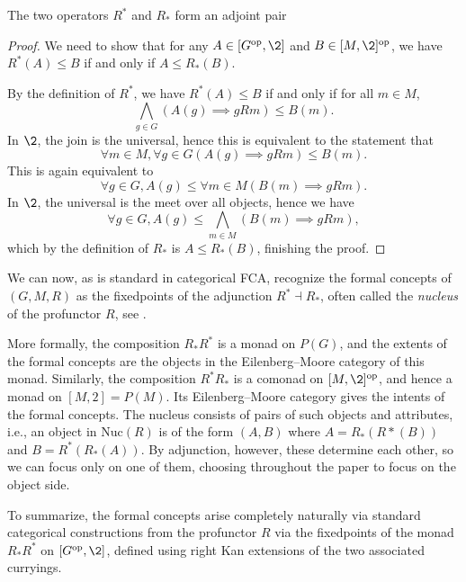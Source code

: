 \begin{lemma}
    \label{lm:adjoint-Delta}
    The two operators $R^*$ and $R_*$ form an adjoint pair
    \begin{center}
    \end{center}
\end{lemma}
\begin{proof}
    We need to show that for any $A\in [G\op, \2]$ and $B\in [M, \2]\op$, we have $R^*(A)\leq B$ if and only if $A\leq R_*(B)$. 

    By the definition of $R^*$, we have $R^*(A)\leq B$ if and only if for all $m\in M$, 
    \[\bigwedge_{g\in G}(A(g)\implies gRm)\leq B(m).\]
    In $\2$, the join is the universal, hence this is equivalent to the statement that 
    \[\forall m\in M, \forall g\in G (A(g)\implies gRm) \leq B(m).\]
    This is again equivalent to 
    \[\forall g\in G, A(g) \leq \forall m\in M (B(m) \implies gRm).\]
    In $\2$, the universal is the meet over all objects, hence we have 
    \[\forall g\in G, A(g) \leq \bigwedge_{m\in M} (B(m) \implies gRm),\]
    which by the definition of $R_*$ is $A\leq R_*(B)$, finishing the proof. 
\end{proof}

We can now, as is standard in categorical FCA, recognize the formal concepts of $(G,M,R)$ as the fixedpoints of the adjunction $R^*\dashv R_*$, often called the \emph{nucleus} of the profunctor $R$, see \cite[Chapter 5]{ferrer_2023}. 

More formally, the composition $R_* R^*$ is a monad on $P(G)$, and the extents of the formal concepts are the objects in the Eilenberg--Moore category of this monad. Similarly, the composition $R^* R_*$ is a comonad on $[M,\2]\op$, and hence a monad on $[M,2] = P(M)$. Its Eilenberg--Moore category gives the intents of the formal concepts. The nucleus consists of pairs of such objects and attributes, i.e., an object in $\mathrm{Nuc}(R)$ is of the form $(A,B)$ where $A = R_*(R*(B))$ and $B=R^* (R_* (A))$. By adjunction, however, these determine each other, so we can focus only on one of them, choosing throughout the paper to focus on the object side. 

To summarize, the formal concepts arise completely naturally via standard categorical constructions from the profunctor $R$ via the fixedpoints of the monad $R_*R^*$ on $[G\op, \2]$, defined using right Kan extensions of the two associated curryings. 

